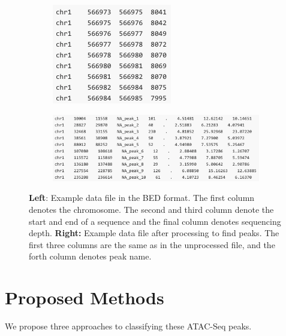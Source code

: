\documentclass{article}
\begin{document}
\begin{figure}[H]
  \centering
  \begin{subfigure}{0.25\textwidth}
    \includegraphics[width = \linewidth]{before_proc}
  \end{subfigure}%
  \hspace{10mm}%
  \begin{subfigure}{0.65\textwidth}
    \includegraphics[width = \linewidth]{after_proc}
  \end{subfigure}
  \label{BED_DATA}
  \caption{\textbf{Left}: Example data file in the BED format.  The first column denotes
  the chromosome.  The second and third column denote the start and end of a
  sequence and the final column denotes sequencing depth.  \textbf{Right:}
  Example data file after processing to find peaks.  The first three columns
  are the same as in the unprocessed file, and the forth column denotes peak name.}
\end{figure}


\newpage
\section{Proposed Methods}
We propose three approaches to classifying these ATAC-Seq peaks.
\end{document}
